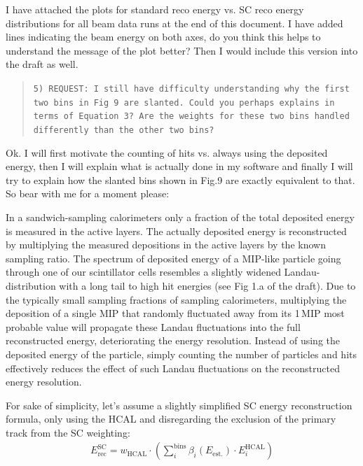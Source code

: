 \documentclass[twoside,a4paper,12pt]{article}
\begin{document}
I have attached the plots for standard reco energy vs. SC reco energy distributions for all beam data runs at the end of this document. I have added lines indicating the beam energy on both axes, do you think this helps to understand the message of the plot better? Then I would include this version into the draft as well. 

\begin{quote}\texttt{5) REQUEST:  I  still have difficulty understanding why the first two bins
in Fig 9 are slanted.  Could you perhaps explains in terms of Equation 3?
Are the weights for these two bins handled differently than the other two
bins?}\end{quote}

Ok. I will first motivate the counting of hits vs. always using the deposited energy, then I will explain what is actually done in my software and finally I will try to explain how the slanted bins 
shown in Fig.9 are exactly equivalent to that. So bear with me for a moment please:

In a sandwich-sampling calorimeters only a fraction of the total deposited energy is measured in the active layers. The actually deposited energy is reconstructed by multiplying the measured depositions in the active layers by the known sampling ratio. The spectrum of deposited energy of a MIP-like particle going through one of our scintillator cells resembles a slightly widened Landau-distribution with a long tail to high hit energies (see Fig 1.a of the draft). Due to the typically small sampling fractions of sampling calorimeters, multiplying the deposition of a single MIP that randomly fluctuated away from its 1\,MIP most probable value will propagate these Landau fluctuations into the full reconstructed energy, deteriorating the energy resolution. Instead of using the deposited energy of the particle, simply counting the number of particles and hits effectively reduces the effect of such Landau fluctuations on the reconstructed energy resolution.

For sake of simplicity, let's assume a slightly simplified SC energy reconstruction formula, only using the HCAL and disregarding the exclusion of the primary track from the SC weighting:
\begin{align}
  E_\text{rec}^\text{SC}=w_{\text{HCAL}} \cdot\left( \sum_{i}^{\text{bins}}\beta_i\left(E_\text{est.}\right)\cdot E^\text{HCAL}_i\right)
\end{align}
\end{document}
